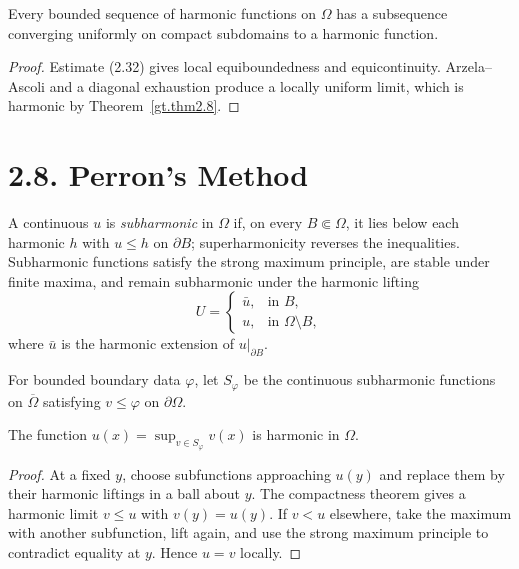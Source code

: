 \begin{theorem}
\label{gt.thm2.11}
Every bounded sequence of harmonic functions on $\Omega$ has a subsequence
converging uniformly on compact subdomains to a harmonic function.
\end{theorem}
\begin{proof}
\sketch Estimate (2.32) gives local equiboundedness and equicontinuity.
Arzela--Ascoli and a diagonal exhaustion produce a locally uniform limit,
which is harmonic by Theorem~\ref{gt.thm2.8}.
\end{proof}

\section*{2.8. Perron's Method}

A continuous $u$ is \emph{subharmonic} in $\Omega$ if, on every
$B\Subset\Omega$, it lies below each harmonic $h$ with $u\leq h$ on
$\partial B$; superharmonicity reverses the inequalities. Subharmonic
functions satisfy the strong maximum principle, are stable under finite
maxima, and remain subharmonic under the harmonic lifting
\begin{equation}
\tag{2.33}
U=\begin{cases}
\bar u,&\text{in }B,\\
u,&\text{in }\Omega\setminus B,
\end{cases}
\end{equation}
where $\bar u$ is the harmonic extension of $u|_{\partial B}$.

For bounded boundary data $\varphi$, let $S_\varphi$ be the continuous
subharmonic functions on $\overline\Omega$ satisfying
$v\leq\varphi$ on $\partial\Omega$.

\begin{theorem}\label{gt.thm2.12}
The function
$u(x)=\sup_{v\in S_\varphi}v(x)$ is harmonic in $\Omega$.
\end{theorem}
\begin{proof}
\sketch At a fixed $y$, choose subfunctions approaching $u(y)$ and replace
them by their harmonic liftings in a ball about $y$. The compactness theorem
gives a harmonic limit $v\leq u$ with $v(y)=u(y)$. If $v<u$ elsewhere,
take the maximum with another subfunction, lift again, and use the strong
maximum principle to contradict equality at $y$. Hence $u=v$ locally.
\end{proof}

